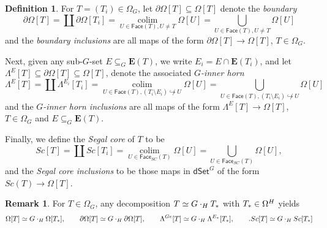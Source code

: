 \documentclass[a4paper,10pt
,draft
]{article}%
\numberwithin{equation}{section}
\numberwithin{figure}{section}
\theoremstyle{definition} %
\newtheorem{definition}[equation]{Definition}%
\newtheorem{remark}[equation]{Remark}%
\newcommand{\into}{\hookrightarrow}%
\newcommand{\dSet}{\mathsf{dSet}}
\DeclareMathOperator{\colim}{colim}%
\newcommand{\1}{\ensuremath{\mathbbm 1}}%
\begin{document}
\begin{definition}
      \label{DSETPRESHEAF_DEF}
      For $T = (T_i) \in \Omega_G$, let $\partial \Omega[T] \subseteq \Omega[T]$ denote the \textit{boundary}
      \begin{equation}
            \partial \Omega[T] = \coprod \partial \Omega[T_i]
            = \mathop{\colim}\limits_{U \in \mathsf{Face}(T), U \neq T} \Omega[U]
            = \bigcup_{U \in \mathsf{Face}(T), U \neq T} \Omega[U]
      \end{equation}
      and the \textit{boundary inclusions} are all maps of the form
      $\partial \Omega[T] \to \Omega[T]$, $T \in \Omega_G$.

      Next, given any sub-$G$-set $E \subseteq_G \boldsymbol{E}(T)$, we write $E_i = E \cap \boldsymbol{E}(T_i)$, and let
      $\Lambda^{E}[T] \subseteq \partial \Omega[T] \subseteq \Omega[T]$,
      denote the associated \textit{$G$-inner horn}
      \begin{equation}
            \label{GINNERHORN_EQ}
            \Lambda^{E}[T] = \coprod \Lambda^{E_i}[T_i]
            = \mathop{\colim}\limits_{U \in \mathsf{Face}(T), (T_i \setminus E_i) \not\into U} \Omega[U]
            = \bigcup_{U \in \mathsf{Face}(T), (T_i \setminus E_i) \not\into U} \Omega[U]
      \end{equation}
      and the \textit{$G$-inner horn inclusions} are all maps of the form
      $\Lambda^{E}[T] \to \Omega[T]$, $T \in \Omega_G$ and $E \subseteq_G \boldsymbol{E}(T)$.

      Finally, we define the \textit{Segal core} of $T$ to be
      \begin{equation}
            \label{eq:SC}
            Sc[T] = \coprod Sc[T_i]
            = \mathop{\colim}\limits_{U \in \mathsf{Face}_{SC}(T)} \Omega[U]
            = \bigcup_{U \in \mathsf{Face}_{SC}(T)} \Omega[U],
      \end{equation}
      and the \textit{Segal core inclusions} to be those maps in $\dSet^G$ of the form
      $Sc(T) \to \Omega[T]$.
\end{definition}


\begin{remark}
      For $T \in \Omega_G$, any decomposition $T \simeq G \cdot_H T_{\**}$ with $T_{\**} \in \Omega^H$ yields
      \[
            \Omega[T] \simeq G \cdot_H \Omega[T_{\**}],
            \qquad
            \partial\Omega[T] \simeq G \cdot_H \partial \Omega[T],
            \qquad
            \Lambda^{Ge}[T] \simeq G \cdot_H \Lambda^{E_{\**}}[T_{\**}],
            \qquad.
            Sc[T] \simeq G \cdot_H Sc[T_{\**}]
      \]
\end{remark}
\end{document}
